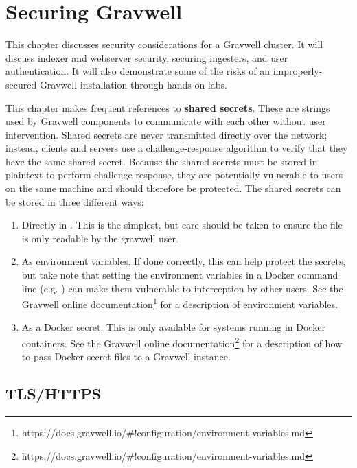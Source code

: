 \chapter{Securing Gravwell}

This chapter discusses security considerations for a Gravwell cluster.
It will discuss indexer and webserver security, securing ingesters, and
user authentication. It will also demonstrate some of the risks of an
improperly-secured Gravwell installation through hands-on labs.

This chapter makes frequent references to \textbf{shared secrets}. These are
strings used by Gravwell components to communicate with each other
without user intervention. Shared secrets are never transmitted directly
over the network; instead, clients and servers use a challenge-response
algorithm to verify that they have the same shared secret. Because the
shared secrets must be stored in plaintext to perform
challenge-response, they are potentially vulnerable to users on the same
machine and should therefore be protected. The shared secrets can be
stored in three different ways:

\begin{enumerate}
\tightlist
\item
  Directly in . This is the simplest, but care should
  be taken to ensure the file is only readable by the gravwell user.
\item
  As environment variables. If done correctly, this can help protect
  the secrets, but take note that setting the environment variables in a
  Docker command line (e.g. ) can
  make them vulnerable to interception by other users. See
  the Gravwell online documentation\footnote{https://docs.gravwell.io/\#!configuration/environment-variables.md} for a description of environment variables.
\item
  As a Docker secret. This is only available for systems running in
  Docker containers. See
  the Gravwell online documentation\footnote{https://docs.gravwell.io/\#!configuration/environment-variables.md} for a description of how to pass Docker secret files to a Gravwell instance.
\end{enumerate}



\section{TLS/HTTPS}


